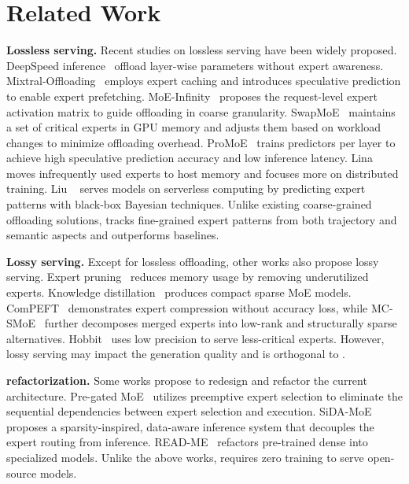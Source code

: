 \section{Related Work}


\noindent \textbf{Lossless \MoE serving.}
Recent studies on lossless \MoE serving have been widely proposed. 
DeepSpeed inference~\cite{aminabadi2022deepspeed} offload layer-wise parameters without expert awareness.
Mixtral-Offloading~\cite{eliseev2023fast} employs \LRU expert caching and introduces speculative prediction to enable expert prefetching. 
MoE-Infinity~\cite{xue2024moe} proposes the request-level expert activation matrix to guide offloading in coarse granularity.
SwapMoE~\cite{swapmoe} maintains a set of critical experts in GPU memory and adjusts them based on workload changes to minimize offloading overhead.
ProMoE~\cite{song2024promoe} trains predictors per \MoE layer to achieve high speculative prediction accuracy and low inference latency. 
Lina~\cite{li2023accelerating} moves infrequently used experts to host memory and focuses more on distributed \MoE training. Liu \etal~\cite{liu2025optimizing} serves \MoE models on serverless computing by predicting expert patterns with black-box Bayesian techniques.
Unlike existing coarse-grained offloading solutions, \sys tracks fine-grained expert patterns from both trajectory and semantic aspects and outperforms \SOTA baselines.

\noindent \textbf{Lossy \MoE serving.}
Except for lossless offloading, other works also propose lossy \MoE serving.
Expert pruning~\cite{chen2022moe,kim2021moe} reduces memory usage by removing underutilized experts.
Knowledge distillation~\cite{rajbhandari2022kd,artetxe2022kd} produces compact sparse MoE models. 
ComPEFT~\cite{yadav2023compeft} demonstrates expert compression without accuracy loss, while MC-SMoE~\cite{li2023merge} further decomposes merged experts into low-rank and structurally sparse alternatives. 
Hobbit~\cite{tang2024hobbit} uses low precision to serve less-critical experts.
However, lossy serving may impact the generation quality and is orthogonal to \sys.

\noindent \textbf{\MoE refactorization.}
Some works propose to redesign and refactor the current \MoE architecture. 
Pre-gated MoE~\cite{hwang2024pre} utilizes preemptive expert selection to eliminate the sequential dependencies between expert selection and execution. 
SiDA-MoE~\cite{du2024sida} proposes a sparsity-inspired, data-aware inference system that decouples the expert routing from inference. 
READ-ME~\cite{cai2024read} refactors pre-trained dense \LLMs into specialized \MoE models.
Unlike the above works, \sys requires zero training to serve open-source \MoE models.

